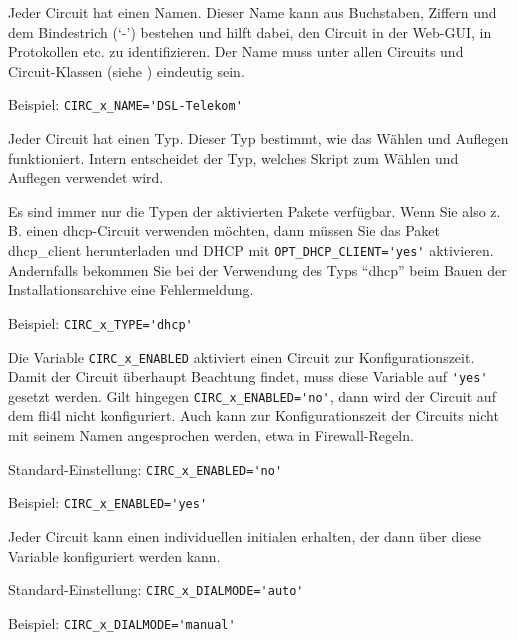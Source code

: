 \begin{description}


Jeder Circuit hat einen Namen. Dieser Name kann aus Buchstaben, Ziffern und dem
Bindestrich (`-') bestehen und hilft dabei, den Circuit in der Web-GUI, in
Protokollen etc. zu identifizieren. Der Name muss unter allen Circuits und
Circuit-Klassen (siehe )
eindeutig sein.

Beispiel: \verb+CIRC_x_NAME='DSL-Telekom'+


Jeder Circuit hat einen Typ. Dieser Typ bestimmt, wie das Wählen und Auflegen
funktioniert. Intern entscheidet der Typ, welches Skript zum Wählen und
Auflegen verwendet wird.

Es sind immer nur die Typen der aktivierten Pakete verfügbar. Wenn Sie also
z.\,B. einen dhcp-Circuit verwenden möchten, dann müssen Sie das Paket
dhcp\_client herunterladen und DHCP mit \verb+OPT_DHCP_CLIENT='yes'+
aktivieren. Andernfalls bekommen Sie bei der Verwendung des Typs ``dhcp'' beim
Bauen der Installationsarchive eine Fehlermeldung.

Beispiel: \verb+CIRC_x_TYPE='dhcp'+


Die Variable \verb+CIRC_x_ENABLED+ aktiviert einen Circuit zur
Konfigurationszeit. Damit der Circuit überhaupt Beachtung findet, muss diese
Variable auf \verb+'yes'+ gesetzt werden. Gilt hingegen
\verb+CIRC_x_ENABLED='no'+, dann wird der Circuit auf dem fli4l nicht
konfiguriert. Auch kann zur Konfigurationszeit der Circuits nicht mit seinem
Namen angesprochen werden, etwa in Firewall-Regeln.

Standard-Einstellung: \verb+CIRC_x_ENABLED='no'+

Beispiel: \verb+CIRC_x_ENABLED='yes'+


Jeder Circuit kann einen individuellen initialen 
erhalten, der dann über diese Variable konfiguriert werden kann.

Standard-Einstellung: \verb+CIRC_x_DIALMODE='auto'+

Beispiel: \verb+CIRC_x_DIALMODE='manual'+



\end{description}

